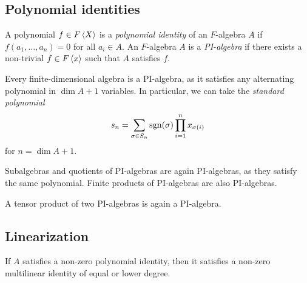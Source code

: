 \obvs

\newpage

\subsection{Polynomial identities}


\begin{definicija}
A polynomial $f \in F \left\langle X\right\rangle$ is a
\emph{polynomial identity} of an
$F$-algebra $A$ if $f(a_1, \dots, a_n) = 0$ for all $a_i \in A$.
An $F$-algebra $A$ is a \emph{PI-algebra} if
there exists a non-trivial $f \in F \left\langle x\right\rangle$ such that $A$
satisfies $f$.
\end{definicija}

\begin{opomba}
Every finite-dimensional algebra is a PI-algebra, as it satisfies
any alternating polynomial in $\dim A + 1$ variables. In
particular, we can take the
\emph{standard polynomial}
\[
s_n =
\sum_{\sigma \in S_n} \operatorname{sgn}(\sigma) \prod_{i=1}^n x_{\sigma(i)}
\]
for $n = \dim A + 1$.
\end{opomba}

\begin{opomba}
Subalgebras and quotients of PI-algebras are again PI-algebras,
as they satisfy the same polynomial. Finite products of PI-algebras
are also PI-algebras.
\end{opomba}

\begin{izrek}[Regev]
A tensor product of two PI-algebras is again a PI-algebra.
\end{izrek}

\newpage

\subsection{Linearization}

\begin{izrek}
If $A$ satisfies a non-zero polynomial identity, then it satisfies
a non-zero multilinear identity of equal or lower degree.
\end{izrek}


